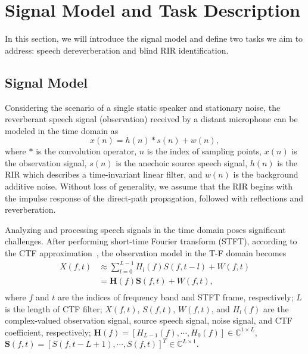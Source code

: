 \section{Signal Model and Task Description}
\label{sec:problem_formulation}
In this section, we will introduce the signal model and define two tasks we aim to address: speech dereverberation and blind RIR identification.

\subsection{Signal Model}

Considering the scenario of a single static speaker and stationary noise, the reverberant speech signal (observation) received by a distant microphone can be modeled in the time domain as
\begin{equation}
    \label{eq:signal_model_time}
    x(n)=h(n)*s(n)+w(n),
\end{equation}
where $*$ is the convolution operator, $n$ is the index of sampling points, $x(n)$ is the observation signal, $s(n)$ is the anechoic source speech signal, $h(n)$ is the RIR which describes a time-invariant linear filter, and $w(n)$ is the background additive noise.
Without loss of generality, we assume that the RIR begins with the impulse response of the direct-path propagation, followed with reflections and reverberation.

Analyzing and processing speech signals in the time domain poses significant challenges.
After performing short-time Fourier transform (STFT), 
according to the CTF approximation~\cite{talmon2009relative}, the observation model in the T-F domain becomes
\begin{equation}
    \label{eq:signal_model_stft}
    \begin{aligned}
        X(f,t)&\approx\sum_{l=0}^{L-1}H_l(f)S(f,t-l)+W(f,t) \\
        &=\mathbf{H}(f)\mathbf{S}(f,t)+W(f,t),\\
    \end{aligned}
\end{equation}
where $f$ and $t$ are the indices of frequency band and STFT frame, respectively; $L$ is the length of CTF filter; $X(f,t)$, $S(f,t)$, $W(f,t)$, and $H_l(f)$ are the complex-valued observation signal, source speech signal, noise signal, and CTF coefficient, respectively; 
$\mathbf{H}(f)=\left[H_{L-1}(f),\cdots,H_0(f)\right]\in\mathbb{C}^{1 \times L}$, $\mathbf{S}(f,t)=\left[S(f,t-L+1),\cdots,S(f,t)\right]^T\in \mathbb{C}^{L \times 1}$.


